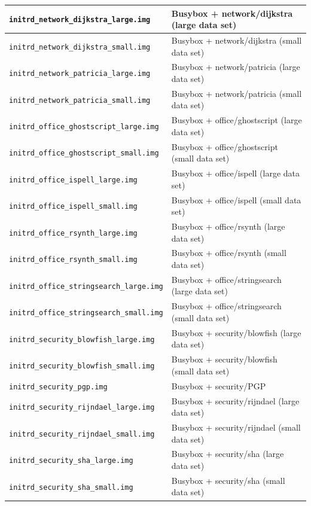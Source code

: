 \begin{table}[!h]
\begin{center}
\begin{tabular}{|l|l|}
		\hline
		\texttt{initrd\_network\_dijkstra\_large.img} & Busybox + network/dijkstra (large data set)\\
		\hline
		\texttt{initrd\_network\_dijkstra\_small.img} & Busybox + network/dijkstra (small data set)\\
		\hline
		\texttt{initrd\_network\_patricia\_large.img} & Busybox + network/patricia (large data set)\\
		\hline
		\texttt{initrd\_network\_patricia\_small.img} & Busybox + network/patricia (small data set)\\
		\hline
		\texttt{initrd\_office\_ghostscript\_large.img} & Busybox + office/ghostscript (large data set)\\
		\hline
		\texttt{initrd\_office\_ghostscript\_small.img} & Busybox + office/ghostscript (small data set)\\
		\hline
		\texttt{initrd\_office\_ispell\_large.img} & Busybox + office/ispell (large data set)\\
		\hline
		\texttt{initrd\_office\_ispell\_small.img} & Busybox + office/ispell (small data set)\\
		\hline
		\texttt{initrd\_office\_rsynth\_large.img} & Busybox + office/rsynth (large data set)\\
		\hline
		\texttt{initrd\_office\_rsynth\_small.img} & Busybox + office/rsynth (small data set)\\
		\hline
		\texttt{initrd\_office\_stringsearch\_large.img} & Busybox + office/stringsearch (large data set)\\
		\hline
		\texttt{initrd\_office\_stringsearch\_small.img} & Busybox + office/stringsearch (small data set)\\
		\hline
		\texttt{initrd\_security\_blowfish\_large.img} & Busybox + security/blowfish (large data set)\\
		\hline
		\texttt{initrd\_security\_blowfish\_small.img} & Busybox + security/blowfish (small data set)\\
		\hline
		\texttt{initrd\_security\_pgp.img} & Busybox + security/PGP\\
		\hline
		\texttt{initrd\_security\_rijndael\_large.img} & Busybox + security/rijndael (large data set)\\
		\hline
		\texttt{initrd\_security\_rijndael\_small.img} & Busybox + security/rijndael (small data set)\\
		\hline
		\texttt{initrd\_security\_sha\_large.img} & Busybox + security/sha (large data set)\\
		\hline
		\texttt{initrd\_security\_sha\_small.img} & Busybox + security/sha (small data set)\\

\end{tabular}
\end{center}
\end{table}

